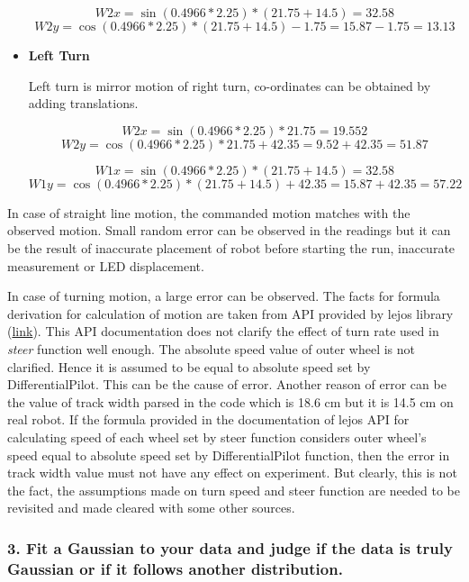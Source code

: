 \documentclass[11pt,a4paper,openright,twoside]{extreport}
\begin{document}
\begin{itemize}
		$$W2x = \sin(0.4966 * 2.25) * (21.75 + 14.5) = 32.58$$
		$$W2y = \cos(0.4966 * 2.25) * (21.75 + 14.5) - 1.75 = 15.87 - 1.75 = 13.13$$

	\item \textbf{Left Turn}
	
	Left turn is mirror motion of right turn, co-ordinates can be obtained by adding translations. 
	
	$$W2x = \sin(0.4966 * 2.25) * 21.75 = 19.552 $$
	$$W2y = \cos(0.4966 * 2.25) * 21.75 + 42.35 = 9.52 + 42.35 = 51.87$$
	
	$$W1x = \sin(0.4966 * 2.25) * (21.75 + 14.5) = 32.58$$
	$$W1y = \cos(0.4966 * 2.25) * (21.75 + 14.5) + 42.35 = 15.87 + 42.35 = 57.22$$
	
	
\end{itemize}

In case of straight line motion, the commanded motion matches with the observed motion. Small random error can be observed in the readings but it can be the result of inaccurate placement of robot before starting the run, inaccurate measurement or LED displacement. 

In case of turning motion, a large error can be observed. The facts for formula derivation for calculation of motion are taken from API provided by lejos library (\href{http://www.lejos.org/nxt/nxj/api/lejos/robotics/navigation/DifferentialPilot.html#steer(double)}{link}). This API documentation does not clarify the effect of turn rate used in \textit{steer} function well enough. The absolute speed value of outer wheel is not clarified. Hence it is assumed to be equal to absolute speed set by DifferentialPilot. This can be the cause of error.
Another reason of error can be the value of track width parsed in the code which is 18.6 cm but it is 14.5 cm on real robot.
If the formula provided in the documentation of lejos API for calculating speed of each wheel set by steer function considers outer wheel's speed equal to absolute speed set by DifferentialPilot function, then the error in track width value must not have any effect on experiment. But clearly, this is not the fact, the assumptions made on turn speed and steer function are needed to be revisited and made cleared with some other sources.      




\subsubsection*{3. Fit a Gaussian to your data and judge if the data is truly Gaussian or if it follows another distribution.}
\end{document}
